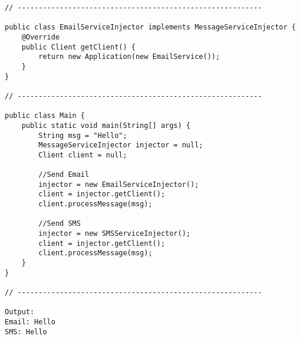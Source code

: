 \begin{verbatim}
// ----------------------------------------------------------

public class EmailServiceInjector implements MessageServiceInjector {
    @Override
    public Client getClient() {
        return new Application(new EmailService());
    }
}

// ----------------------------------------------------------

public class Main {
    public static void main(String[] args) {
        String msg = "Hello";
        MessageServiceInjector injector = null;
        Client client = null;

        //Send Email
        injector = new EmailServiceInjector();
        client = injector.getClient();
        client.processMessage(msg);

        //Send SMS
        injector = new SMSServiceInjector();
        client = injector.getClient();
        client.processMessage(msg);
    }
}

// ----------------------------------------------------------

Output:
Email: Hello
SMS: Hello

\end{verbatim}
\appendix